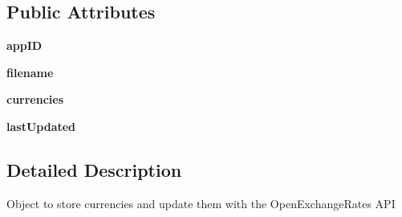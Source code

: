 \subsection*{Public Attributes}
\begin{DoxyCompactItemize}
\item 
\hypertarget{class_solar_calculator_1_1_utils_1_1_py_exchange_rates_1_1_exchange_a6ea5cf5afca25aec17e9f72c23f4036f}{{\bfseries app\-I\-D}}\label{class_solar_calculator_1_1_utils_1_1_py_exchange_rates_1_1_exchange_a6ea5cf5afca25aec17e9f72c23f4036f}

\item 
\hypertarget{class_solar_calculator_1_1_utils_1_1_py_exchange_rates_1_1_exchange_ac7d94849c0d84838ea4b7c111b6836af}{{\bfseries filename}}\label{class_solar_calculator_1_1_utils_1_1_py_exchange_rates_1_1_exchange_ac7d94849c0d84838ea4b7c111b6836af}

\item 
\hypertarget{class_solar_calculator_1_1_utils_1_1_py_exchange_rates_1_1_exchange_a87d54fb0b9db201a6c13156bdd39826c}{{\bfseries currencies}}\label{class_solar_calculator_1_1_utils_1_1_py_exchange_rates_1_1_exchange_a87d54fb0b9db201a6c13156bdd39826c}

\item 
\hypertarget{class_solar_calculator_1_1_utils_1_1_py_exchange_rates_1_1_exchange_a17958ba775ae366b83238009b535a00b}{{\bfseries last\-Updated}}\label{class_solar_calculator_1_1_utils_1_1_py_exchange_rates_1_1_exchange_a17958ba775ae366b83238009b535a00b}

\end{DoxyCompactItemize}


\subsection{Detailed Description}
\begin{DoxyVerb}Object to store currencies and update them with the OpenExchangeRates API\end{DoxyVerb}
 

